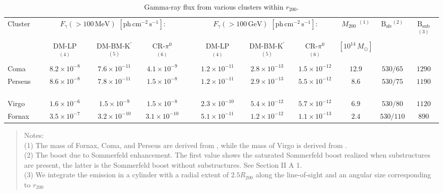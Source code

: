 \documentclass[10pt,aps,pra,reprint,amsmath,amsfonts,amssymb,showpacs,nofootinbib,floatfix]{revtex4-1}
\newcommand{\rmn}{\mathrm}
\newcommand{\msun}{M_\odot}
\newcommand{\Kp}{\rmn{K}^\prime}
\newcommand{\B}{\rmn{B}}
\newcommand{\rvir}{r_{200}}
\newcommand{\mvir}{M_{200}}
\begin{document}
\begin{table}
\begin{minipage}{2.0\columnwidth}
  \caption{Gamma-ray flux from various clusters within $\rvir$.}
\begin{tabular}{l  c c c  c  c c c c c c}
\hline
\hline
 Cluster &
\multicolumn{3}{c}{$F_{\gamma}(>100\,\rmn{MeV})$ $[\rmn{ph}\,\rmn{cm}^{-2}\,\rmn{s}^{-1}]$:} & &
\multicolumn{3}{c}{$F_{\gamma}(>100\,\rmn{GeV})$ $[\rmn{ph}\,\rmn{cm}^{-2}\,\rmn{s}^{-1}]$:} & 
$\mvir$ $^{(1)}$ & $\B_\rmn{sfe} $$^{(2)}$ &  $\B_\rmn{sub} $$^{(3)}$ \\
         & DM-LP $^{(4)}$ & DM-BM-$\Kp$ $^{(5)}$ & CR-$\pi^0$ $^{(6)}$ 
         & & DM-LP $^{(4)}$ & DM-BM-$\Kp$ $^{(5)}$ & CR-$\pi^0$ $^{(6)}$ & $[10^{14}\,\msun]$ &&  \\
 \hline
 Coma                 & $8.2\times10^{-8}$  & $7.6\times10^{-11}$ & $4.1\times10^{-9}$  
 & \,\,\,\,\,         & $1.2\times10^{-11}$ & $2.8\times10^{-13}$ & $1.5\times10^{-12}$ 
 & $12.9$ & $530/65$  & $1290$ \\
 Perseus \,\,\,\,\,\, & $8.6\times10^{-8}$  & $7.8\times10^{-11}$ & $1.5\times10^{-8}$  
 & \,\,\,\,\,         & $1.2\times10^{-11}$ & $2.9\times10^{-13}$ & $5.5\times10^{-12}$ 
 & $8.6$ & $530/75$  & $1190$ \\
 Virgo                & $1.6\times10^{-6}$  & $1.5\times10^{-9}$ & $1.5\times10^{-8}$  
 & \,\,\,\,\,         & $2.3\times10^{-10}$ & $5.4\times10^{-12}$ & $5.7\times10^{-12}$ 
 & $6.9$  & $530/80$  & $1120$  \\
 Fornax               & $3.5\times10^{-7}$  & $3.2\times10^{-10}$ & $3.1\times10^{-10}$ 
 & \,\,\,\,\,         & $5.1\times10^{-11}$ & $1.2\times10^{-12}$ & $1.1\times10^{-13}$ 
 & $2.4$  & $530/110$  & $890$  \\
\hline
\hline
\end{tabular}
\begin{quote}
  Notes: \\
  (1) The mass of Fornax, Coma, and Perseus are derived from \cite{2007A&A...466..805C}, 
  while the mass of Virgo is derived from \cite{1984ApJ...281...31T}.\\
  (2) The boost due to Sommerfeld enhancement. The first value shows the saturated 
  Sommerfeld boost realized when substructures are present, the latter is the Sommerfeld 
  boost without substructures. See Section II A 1.\\
  (3) We integrate the emission in a cylinder with a radial extent of $2.5
  R_{200}$ along the line-of-sight and an angular size corresponding to $\rvir$

\end{quote}
\end{minipage}
\end{table}
\end{document}
